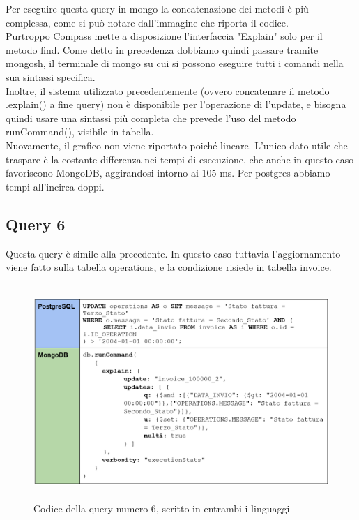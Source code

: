 \noindent Per eseguire questa query in mongo la concatenazione dei metodi è più complessa, come si può notare dall'immagine che riporta il codice.\\
Purtroppo Compass mette a disposizione l'interfaccia "Explain" solo per il metodo find. Come detto in precedenza dobbiamo quindi passare tramite mongosh, il terminale di mongo su cui si possono eseguire tutti i comandi nella sua sintassi specifica.\\
Inoltre, il sistema utilizzato precedentemente (ovvero concatenare il metodo .explain() a fine query) non è disponibile per l'operazione di l'update, e bisogna quindi usare una sintassi più completa che prevede l'uso del metodo runCommand(), visibile in tabella.\\

\noindent Nuovamente, il grafico non viene riportato poiché lineare. L'unico dato utile che traspare è la costante differenza nei tempi di esecuzione, che anche in questo caso favoriscono MongoDB, aggirandosi intorno ai 105 ms. Per postgres abbiamo tempi all'incirca doppi.\\


\subsection{Query 6}
Questa query è simile alla precedente. In questo caso tuttavia l'aggiornamento viene fatto sulla tabella operations, e la condizione risiede in tabella invoice.\\

\begin{figure}[htbp]
\begin{center}
\includegraphics[height=22em]{immagini/query/query6.png}
\caption{Codice della query numero 6, scritto in entrambi i linguaggi}
\end{center}
\end{figure}

